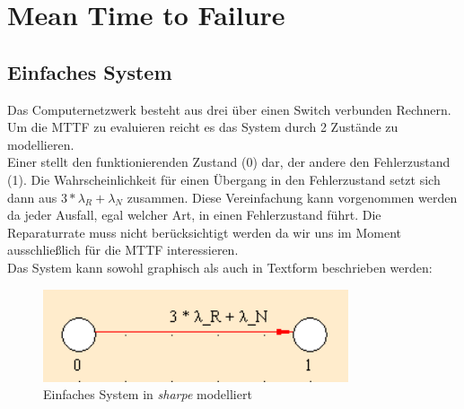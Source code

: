 \documentclass[10pt,a4paper]{article}
\begin{document}
\section{Mean Time to Failure} 
\label{sec:mttf}
\subsection{Einfaches System}
Das Computernetzwerk besteht aus drei über einen Switch verbunden Rechnern.
\\
Um die MTTF zu evaluieren reicht es das System durch 2 Zustände zu modellieren. \\
Einer stellt den funktionierenden Zustand (0) dar, der andere den Fehlerzustand (1).
Die Wahrscheinlichkeit für einen Übergang in den Fehlerzustand setzt sich dann aus $3*\lambda_R + \lambda_N$ zusammen. Diese Vereinfachung kann vorgenommen werden da jeder Ausfall, egal welcher Art, in einen Fehlerzustand führt. 
Die Reparaturrate muss nicht berücksichtigt werden da wir uns im Moment ausschließlich für die MTTF interessieren.
\\
Das System kann sowohl graphisch als auch in Textform beschrieben werden:
\begin{figure}[ht!]
\centering
\includegraphics[width=90mm]{MTTM_EinfachesModell.png}
\caption{Einfaches System in \textit{sharpe} modelliert \label{mmtm_einfach}}
\end{figure}


\newpage
\end{document}
